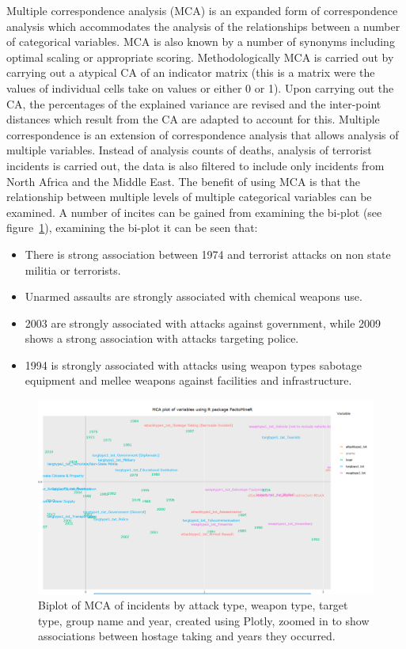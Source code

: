 Multiple correspondence analysis (MCA) is an expanded form of correspondence analysis which accommodates the analysis of the relationships between a number of categorical variables. MCA is also known by a number of synonyms including  optimal scaling or appropriate scoring. Methodologically MCA is carried out by carrying out a atypical CA of an indicator matrix (this is a matrix were the values of individual cells take on values or either 0 or 1). Upon carrying out the CA, the percentages of the explained variance are revised and the inter-point distances which result from the CA are adapted to account for this. Multiple correspondence is an extension of correspondence analysis that allows analysis of multiple variables. Instead of analysis counts of deaths, analysis of terrorist incidents is carried out, the data is also filtered to include only incidents from North Africa and the Middle East. The benefit of using MCA is that the relationship between multiple levels of multiple categorical variables can be examined. A number of incites can be gained from examining the bi-plot (see figure~\ref{fig:biplotmca}), examining the bi-plot it can be seen that:
\begin{itemize}
\item  There is strong association between 1974 and terrorist attacks on non state militia or terrorists.
\item Unarmed assaults are strongly associated with chemical weapons use.
\item 2003 are strongly associated with attacks against government, while 2009 shows a strong association with attacks targeting police.  
\item 1994 is strongly associated with attacks using weapon types sabotage equipment and mellee weapons against facilities and infrastructure.
\end{itemize}

\begin{figure}[t]
\includegraphics[width=15cm]{Peters_experiment_markdown_files/figure-latex/newplot3.png}
\caption{Biplot of MCA of incidents by attack type, weapon type, target type, group name and year, created using Plotly, zoomed in to show associations between hostage taking and years they occurred.}
\label{fig:biplotmca}
\centering
\end{figure}

